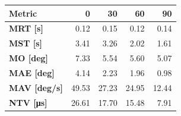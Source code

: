\begin{tabular*}{\textwidth}{@{\extracolsep{\fill}}l|rrrr}
    \toprule
    \textbf{Metric} & \textbf{0} & \textbf{30} & \textbf{60} & \textbf{90}\\
    \midrule
    \textbf{MRT [s]} & 0.12 & 0.15 & 0.12 & 0.14 \\
    \textbf{MST [s]} & 3.41 & 3.26 & 2.02 & 1.61 \\
    \textbf{MO  [deg]} & 7.33 & 5.54 & 5.60 & 5.07 \\
    \textbf{MAE [deg]} & 4.14 & 2.23 & 1.96 & 0.98 \\
    \textbf{MAV [deg/s]} & 49.53 & 27.23 & 24.95 & 12.44 \\
    \textbf{NTV [\si{\micro\second}]} & 26.61 & 17.70 & 15.48 & 7.91 \\
    \bottomrule
\end{tabular*}

